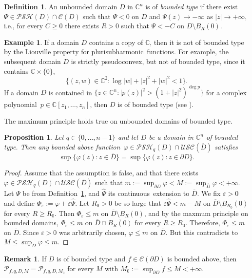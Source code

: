\documentclass[reqno]{amsart}
\newtheorem{prop}[thm]{Proposition}
\theoremstyle{definition}
\newtheorem{defn}[thm]{Definition}
\newtheorem{ex}[thm]{Example}
\newtheorem{rem}[thm]{Remark}
\numberwithin{equation}{section}
\newcommand{\cbb}{\mathbb{C}}
\newcommand{\ccal}{\mathcal{C}}
\newcommand{\pcal}{\mathcal{P}}
\newcommand{\USC}{\mathcal{USC}}
\newcommand{\psh}{pluri\-sub\-harmonic}
\newcommand{\PSH}{\mathcal{PSH}}
\newcommand{\spsc}{strictly pseudo\-convex}
\newcommand{\cl}[1]{\overline{#1}}
\newcommand{\cont}{continuous}
\newcommand{\fct}{function}
\newcommand{\fcts}{functions}
\newcommand{\cld}{\overline{D}}
\newcommand{\eps}{\varepsilon}
\newcommand{\vphi}{\varphi}
\begin{document}
\begin{defn}\label{defn-bounded-type} An unbounded domain $D$ in $\cbb^n$ is of \textit{bounded type} if there exist $\Psi \in \PSH(D)\cap \ccal(D)$ such that $\Psi <0$ on $D$ and $\Psi(z)\to-\infty$ as $|z|\to+\infty$, i.e., for every $C\geq0$ there exists $R>0$ such that $\Psi < -C$ on $D\setminus B_R(0)$.
\end{defn}

\begin{ex} If a domain $D$ contains a copy of $\cbb$, then it is not of bounded type by the Liouville property for \psh\ \fcts. For example, the subsequent domain $D$ is \spsc, but not of bounded type, since it contains  $\cbb\times\{0\}$,
\[
\{(z,w) \in \cbb^2 : \log|w| + |z|^2+|w|^2<1\}.
\]
If a domain $D$ is contained in $\{z \in \cbb^n : |p(z)|^2>(1+|z|^2)^{\deg p}\}$ for a complex polynomial~$p \in \cbb[z_1,\ldots,z_n]$, then $D$ is of bounded type (see \cite{NH}). 
\end{ex}

The maximum principle holds true on unbounded domains of bounded type.

\begin{prop} \label{prop-qpsh-max-princ-2} Let $q\in\{ 0,\ldots,n-1\}$ and let $D$ be a domain in $\cbb^n$ of bounded type. Then any bounded above \fct\ $\vphi \in \PSH_q(D) \cap \USC(\cl{D})$ satisfies
\[
\sup\{ \vphi(z) : z \in \cl{D}\} = \sup\{\vphi(z) : z \in \partial D\}.
\]
\end{prop}

\begin{proof} Assume that the assumption is false, and that there exists $\vphi \in \PSH_q(D) \cap \USC(\cl{D})$ such that $
m:=\sup_{\partial D}\vphi < M:=\sup_{\cld} \vphi < +\infty$. Let $\Psi$ be from Definition~\ref{defn-bounded-type}, and $\widehat{\Psi}$ its \cont\ extension to $\cld$. We fix $\eps>0$ and define $\Phi_{\eps}:=\varphi+\eps\widehat{\Psi}$. Let $R_0>0$ be so large that $\eps\widehat{\Psi}< m-M$ on $\cld\setminus B_{R_0}(0)$ for every $R\geq R_0$. Then $\Phi_{\eps} \leq m$ on $\cld\setminus B_{R}(0)$, and by the maxmum principle on bounded domains, $\Phi_{\eps} \leq m$ on $\cld \cap \cl{B_{R}(0)}$ for every $R \geq R_0$. Therefore, $\Phi_{\eps} \leq m$ on $\cld$. Since $\eps>0$ was arbitrarily chosen, $\varphi \leq m$ on $\cld$. But this contradicts to $M\leq\sup_{\cld} \vphi \leq m$.
\end{proof}

\begin{rem}\label{rem-qpsh-max-princ-2} If $D$ is of bounded type and $f \in\ccal(\partial D)$ is bounded above, then $\pcal_{f,q,D,M} =\pcal_{f,q,D,M_0}$ for every $M$ with $M_0:=\sup_{\partial D} f \leq M < +\infty$.
\end{rem}
\end{document}
